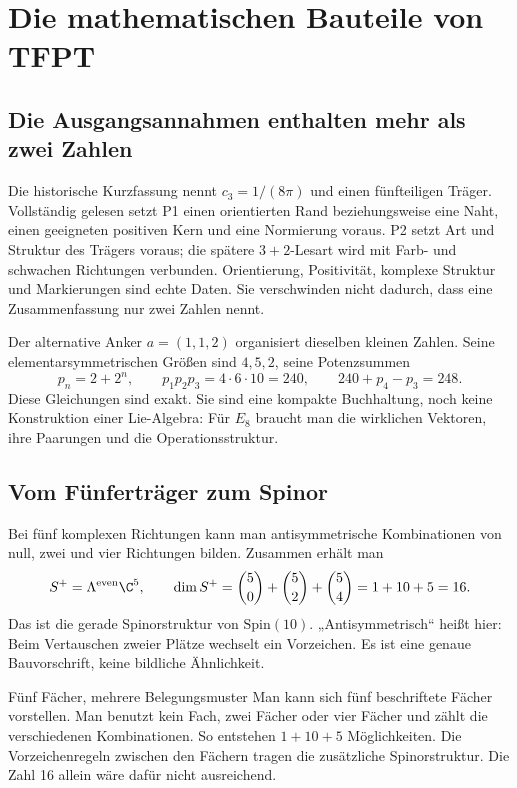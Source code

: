 \chapter{Die mathematischen Bauteile von TFPT}
\label{ch:algebra}
\section{Die Ausgangsannahmen enthalten mehr als zwei Zahlen}
Die historische Kurzfassung nennt $c_3=1/(8\pi)$ und einen fünfteiligen Träger. Vollständig gelesen setzt P1 einen orientierten Rand beziehungsweise eine Naht, einen geeigneten positiven Kern und eine Normierung voraus. P2 setzt Art und Struktur des Trägers voraus; die spätere $3+2$-Lesart wird mit Farb- und schwachen Richtungen verbunden. Orientierung, Positivität, komplexe Struktur und Markierungen sind echte Daten. Sie verschwinden nicht dadurch, dass eine Zusammenfassung nur zwei Zahlen nennt. 

Der alternative Anker $a=(1,1,2)$ organisiert dieselben kleinen Zahlen. Seine elementarsymmetrischen Größen sind $4,5,2$, seine Potenzsummen
\begin{equation}
p_n=2+2^n,\qquad p_1p_2p_3=4\cdot6\cdot10=240,
\qquad240+p_4-p_3=248.
\end{equation}
Diese Gleichungen sind exakt. Sie sind eine kompakte Buchhaltung, noch keine Konstruktion einer Lie-Algebra: Für $E_8$ braucht man die wirklichen Vektoren, ihre Paarungen und die Operationsstruktur.

\section{Vom Fünferträger zum Spinor}
Bei fünf komplexen Richtungen kann man antisymmetrische Kombinationen von null, zwei und vier Richtungen bilden. Zusammen erhält man
\begin{equation}
S^+=\Lambda^{\mathrm{even}}\C^5,
\qquad\dim S^+=\binom50+\binom52+\binom54=1+10+5=16.
\end{equation}
Das ist die gerade Spinorstruktur von $\mathrm{Spin}(10)$. „Antisymmetrisch“ heißt hier: Beim Vertauschen zweier Plätze wechselt ein Vorzeichen. Es ist eine genaue Bauvorschrift, keine bildliche Ähnlichkeit.

\begin{bild}{Fünf Fächer, mehrere Belegungsmuster}
Man kann sich fünf beschriftete Fächer vorstellen. Man benutzt kein Fach, zwei Fächer oder vier Fächer und zählt die verschiedenen Kombinationen. So entstehen $1+10+5$ Möglichkeiten. Die Vorzeichenregeln zwischen den Fächern tragen die zusätzliche Spinorstruktur. Die Zahl 16 allein wäre dafür nicht ausreichend.
\end{bild}

